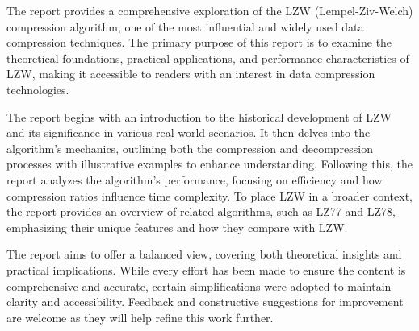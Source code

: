 \vspace{10pt}

The report provides a comprehensive exploration of the LZW (Lempel-Ziv-Welch) compression algorithm, one of the most influential and widely used data compression techniques. The primary purpose of this report is to examine the theoretical foundations, practical applications, and performance characteristics of LZW, making it accessible to readers with an interest in data compression technologies.

\vspace{10pt}

The report begins with an introduction to the historical development of LZW and its significance in various real-world scenarios. It then delves into the algorithm's mechanics, outlining both the compression and decompression processes with illustrative examples to enhance understanding. Following this, the report analyzes the algorithm's performance, focusing on efficiency and how compression ratios influence time complexity. To place LZW in a broader context, the report provides an overview of related algorithms, such as LZ77 and LZ78, emphasizing their unique features and how they compare with LZW.
\vspace{10pt}

The report aims to offer a balanced view, covering both theoretical insights and practical implications. While every effort has been made to ensure the content is comprehensive and accurate, certain simplifications were adopted to maintain clarity and accessibility. Feedback and constructive suggestions for improvement are welcome as they will help refine this work further.